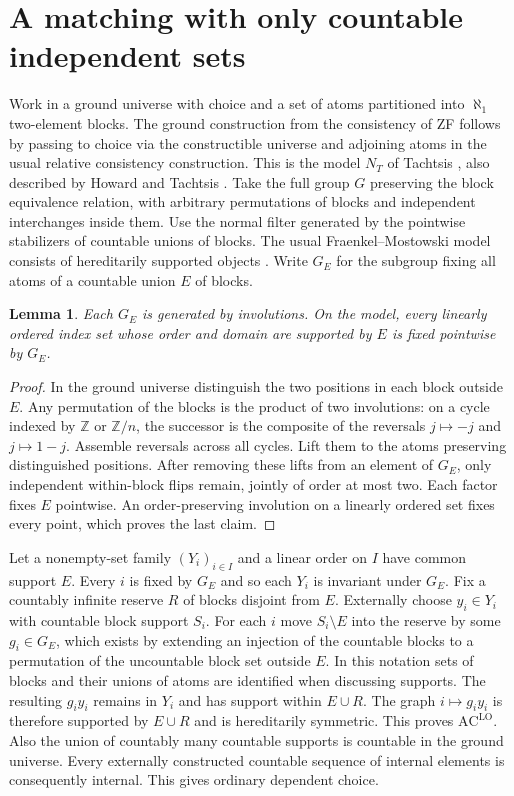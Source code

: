 \documentclass[11pt]{article}
\newtheorem{lemma}[theorem]{Lemma}
\begin{document}
\section{A matching with only countable independent sets}
Work in a ground universe with choice and a set of atoms partitioned into $\aleph_1$ two-element blocks. The ground construction from the consistency of ZF follows by passing to choice via the constructible universe and adjoining atoms in the usual relative consistency construction. This is the model $N_T$ of Tachtsis \cite[Theorem~3]{t24}, also described by Howard and Tachtsis \cite[Section~6.5]{ht26}. Take the full group $G$ preserving the block equivalence relation, with arbitrary permutations of blocks and independent interchanges inside them. Use the normal filter generated by the pointwise stabilizers of countable unions of blocks. The usual Fraenkel--Mostowski model consists of hereditarily supported objects \cite{hr}. Write $G_E$ for the subgroup fixing all atoms of a countable union $E$ of blocks.

\begin{lemma}
Each $G_E$ is generated by involutions. On the model, every linearly ordered index set whose order and domain are supported by $E$ is fixed pointwise by $G_E$.
\end{lemma}
\begin{proof}
In the ground universe distinguish the two positions in each block outside $E$. Any permutation of the blocks is the product of two involutions: on a cycle indexed by $\mathbb Z$ or $\mathbb Z/n$, the successor is the composite of the reversals $j\mapsto-j$ and $j\mapsto1-j$. Assemble reversals across all cycles. Lift them to the atoms preserving distinguished positions. After removing these lifts from an element of $G_E$, only independent within-block flips remain, jointly of order at most two. Each factor fixes $E$ pointwise. An order-preserving involution on a linearly ordered set fixes every point, which proves the last claim.
\end{proof}

Let a nonempty-set family $(Y_i)_{i\in I}$ and a linear order on $I$ have common support $E$. Every $i$ is fixed by $G_E$ and so each $Y_i$ is invariant under $G_E$. Fix a countably infinite reserve $R$ of blocks disjoint from $E$. Externally choose $y_i\in Y_i$ with countable block support $S_i$. For each $i$ move $S_i\setminus E$ into the reserve by some $g_i\in G_E$, which exists by extending an injection of the countable blocks to a permutation of the uncountable block set outside $E$. In this notation sets of blocks and their unions of atoms are identified when discussing supports. The resulting $g_i y_i$ remains in $Y_i$ and has support within $E\cup R$. The graph $i\mapsto g_i y_i$ is therefore supported by $E\cup R$ and is hereditarily symmetric. This proves $\mathrm{AC}^{\mathrm{LO}}$. Also the union of countably many countable supports is countable in the ground universe. Every externally constructed countable sequence of internal elements is consequently internal. This gives ordinary dependent choice.
\end{document}
